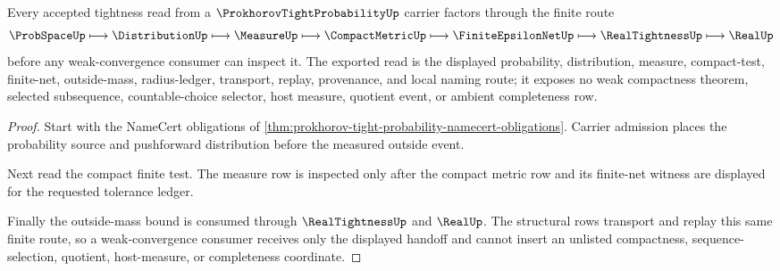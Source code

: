 \begin{theorem}
\label{thm:prokhorov-tight-probability-finite-net-handoff}
Every accepted tightness read from a $\ProkhorovTightProbabilityUp$ carrier factors through the finite route
$$
\ProbSpaceUp \longmapsto \DistributionUp \longmapsto \MeasureUp \longmapsto \CompactMetricUp \longmapsto \FiniteEpsilonNetUp \longmapsto \RealTightnessUp \longmapsto \RealUp
$$
before any weak-convergence consumer can inspect it. The exported read is the displayed probability, distribution, measure, compact-test, finite-net, outside-mass, radius-ledger, transport, replay, provenance, and local naming route; it exposes no weak compactness theorem, selected subsequence, countable-choice selector, host measure, quotient event, or ambient completeness row.
\end{theorem}
\begin{proof}
Start with the NameCert obligations of \autoref{thm:prokhorov-tight-probability-namecert-obligations}. Carrier admission places the probability source and pushforward distribution before the measured outside event.

Next read the compact finite test. The measure row is inspected only after the compact metric row and its finite-net witness are displayed for the requested tolerance ledger.

Finally the outside-mass bound is consumed through $\RealTightnessUp$ and $\RealUp$. The structural rows transport and replay this same finite route, so a weak-convergence consumer receives only the displayed handoff and cannot insert an unlisted compactness, sequence-selection, quotient, host-measure, or completeness coordinate.
\end{proof}

